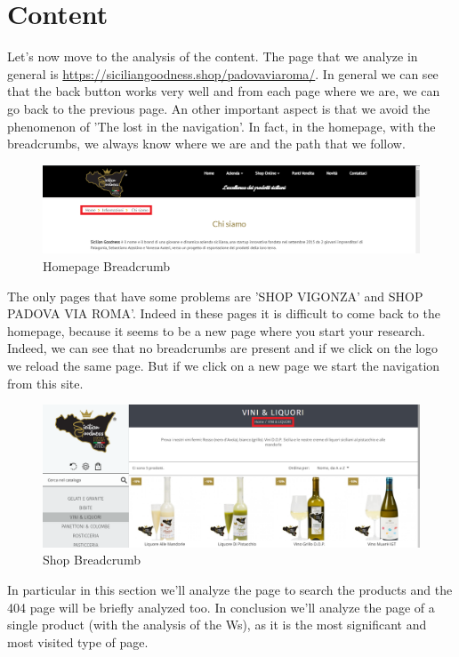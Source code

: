 \section{Content}

Let's now move to the analysis of the content.
The page that we analyze in general is \url{https://siciliangoodness.shop/padovaviaroma/}. 
In general we can see that the back button works very well and from each page where we are, we can go back to the previous page.
An other important aspect is that we avoid the phenomenon of 'The lost in the navigation'. In fact, in the homepage, with the breadcrumbs, we always know where we are and the path that we follow. 

\begin{figure}[H]
	\centering\includegraphics[width=12cm]{Img/bred2.png}
	\caption{Homepage Breadcrumb}
\end{figure}

The only pages that have some problems are 'SHOP VIGONZA' and SHOP PADOVA VIA ROMA'. Indeed in these pages it is difficult to come back to the homepage, because it seems to be a new page where you start your research. Indeed, we can see that no breadcrumbs are present and if we click on the logo we reload the same page. But if we click on a new page we start the navigation from this site.

\begin{figure}[H]
	\centering\includegraphics[width=12cm]{Img/bred1.png}
	\caption{Shop Breadcrumb}
\end{figure} 

In particular in this section we'll analyze the page to search the products and the 404 page will be briefly analyzed too. In conclusion we'll analyze the page of a single product (with the analysis of the Ws), as it is the most significant and most visited type of page.

